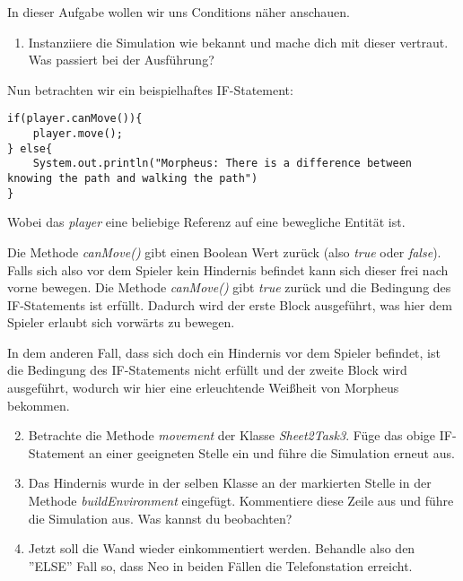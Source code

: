 In dieser Aufgabe wollen wir uns Conditions näher anschauen.
\begin{enumerate}[label=\alph*)]                           
    \item Instanziiere die Simulation wie bekannt und mache dich mit dieser vertraut.
    Was passiert bei der Ausführung?
\end{enumerate}

\begin{Infobox}[IF-Condition]
    Nun betrachten wir ein beispielhaftes IF-Statement:
    \begin{lstlisting}[breaklines=true, numbers=none]
if(player.canMove()){
    player.move();
} else{
    System.out.println("Morpheus: There is a difference between knowing the path and walking the path")
}
    \end{lstlisting}
    Wobei das \textit{player} eine beliebige Referenz auf eine bewegliche Entität ist.\par
    Die Methode \textit{canMove()} gibt einen Boolean Wert zurück (also \textit{true} oder \textit{false}).
    Falls sich also vor dem Spieler kein Hindernis befindet kann sich dieser frei nach vorne bewegen. Die Methode
    \textit{canMove()} gibt \textit{true} zurück und die Bedingung des IF-Statements ist erfüllt. Dadurch wird der erste Block
    ausgeführt, was hier dem Spieler erlaubt sich vorwärts zu bewegen.\par 
    In dem anderen Fall, dass sich doch ein Hindernis vor dem Spieler befindet, ist die Bedingung des IF-Statements nicht erfüllt und 
    der zweite Block wird ausgeführt, wodurch wir hier eine erleuchtende Weißheit von Morpheus bekommen.
\end{Infobox}
\begin{enumerate}[label=\alph*)] \setcounter{enumi}{1}
    \item Betrachte die Methode \textit{movement} der Klasse \textit{Sheet2Task3}. Füge das obige IF-Statement an einer geeigneten Stelle ein 
    und führe die Simulation erneut aus.
    \item Das Hindernis wurde in der selben Klasse an der markierten Stelle in der Methode \textit{buildEnvironment} eingefügt.
    Kommentiere diese Zeile aus und führe die Simulation aus. Was kannst du beobachten?
    \item Jetzt soll die Wand wieder einkommentiert werden. Behandle also den ''ELSE'' Fall so, dass Neo in beiden Fällen die Telefonstation erreicht.

\end{enumerate}
